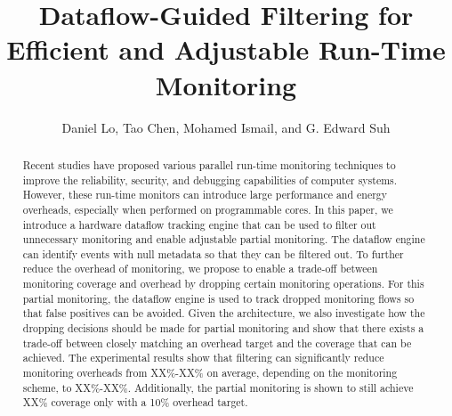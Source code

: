 \title{
Dataflow-Guided Filtering for Efficient and Adjustable Run-Time Monitoring
}

{\author{Daniel Lo, Tao Chen, Mohamed Ismail, and G. Edward Suh}}

\date{}
\maketitle

\thispagestyle{empty}

\begin{abstract}

Recent studies have proposed various parallel run-time monitoring techniques to
improve the reliability, security, and debugging capabilities of computer
systems. However, these run-time monitors can introduce large performance and energy
overheads, especially when performed on programmable cores.
In this paper, we introduce a hardware dataflow tracking engine that can be
used to filter out unnecessary monitoring and enable adjustable partial monitoring.
The dataflow engine can identify events with null metadata so that they can
be filtered out. To further reduce the overhead of monitoring, we propose
to enable a trade-off between monitoring coverage and overhead by dropping certain
monitoring operations. For this partial monitoring, the dataflow engine is used
to track dropped monitoring flows so that false positives can be avoided.
Given the architecture, we also investigate how the dropping decisions should be
made for partial monitoring and show that there exists a trade-off between closely
matching an overhead target and the coverage that can be achieved.
The experimental results show that filtering can significantly reduce monitoring
overheads from XX\%-XX\% on average, depending on the monitoring scheme, to
XX\%-XX\%. Additionally, the partial monitoring is shown to still achieve XX\% coverage 
only with a 10\% overhead target.

\end{abstract}
